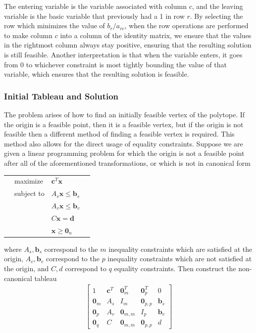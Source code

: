 \documentclass[10pt]{article}
\renewcommand{\vec}[1]{\mathbf{#1}}
\newcommand{\x}{\vec{x}}
\newcommand{\vz}[1]{\vec{0}_{#1}}
\renewcommand{\b}{\vec{b}}
\renewcommand{\c}{\vec{c}}
\begin{document}
The entering variable is the variable associated with column $c$, and the leaving variable is the basic variable that previously had a 1 in row $r$. By selecting the row which minimizes the value of $b_r/a_{rc}$, when the row operations are performed to make column $c$ into a column of the identity matrix, we ensure that the values in the rightmost column always stay positive, ensuring that the resulting solution is still feasible. Another interpretation is that when the variable enters, it goes from 0 to whichever constraint is most tightly bounding the value of that variable, which ensures that the resulting solution is feasible. \cite{dantzig}
\subsubsection{Initial Tableau and Solution}
\label{lp:sa-phaseone}
The problem arises of how to find an initially feasible vertex of the polytope. If the origin is a feasible point, then it is a feasible vertex, but if the origin is not feasible then a different method of finding a feasible vertex is required. This method also allows for the direct usage of equality constraints. Suppose we are given a linear programming problem for which the origin is not a feasible point after all of the aforementioned transformations, or which is not in canonical form
\begin{tabularx}{\textwidth}{X l l X}
	& maximize		& $\c^T\x$ & \\
	& subject to	& $A_s\x\leq \b_s$ & \\
	& 				& $A_v\x\leq \b_v$ & \\
	& 				& $C\x = \vec{d}$ & \\
	& 				& $\x\geq\vz{n}$ & 
\end{tabularx}
where $A_s, \b_s$ correspond to the $m$ inequality constraints which are satisfied at the origin, $A_v, \b_v$ correspond to the $p$ inequality constraints
which are not satisfied at the origin, and $C, d$ correspond to $q$ equality constraints. Then construct the non-canonical tableau 
\begin{align*}
\begin{bmatrix}
1		& \c^T	& \vz{m}^T	&\vz{p}^T	& 0\\
\vz{m}	& A_s	& I_m 		& \vz{p,p}	& \b_s\\
\vz{p}	& A_v	& \vz{m,m}	& I_p		& \b_v\\
\vz{q}	& C		& \vz{m,m}	& \vz{p,p}	& d
\end{bmatrix}
\end{align*}
\end{document}
